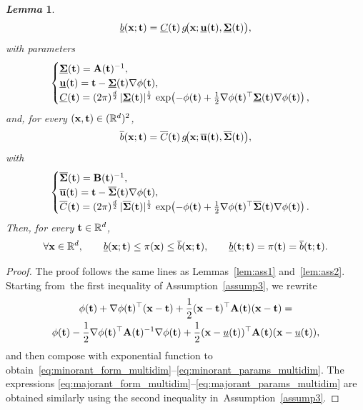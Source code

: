 \documentclass[review]{elsarticle}
\newtheorem{lemma}{\em Lemma}
\def\x{{\bf x}}
\def\u{{\bf u}}
\def\t{{\bf t}}
\def\A{{\bf A}}
\def\B{{\bf B}}
\begin{document}
{\begin{lemma}
\begin{equation}
\underline{b}(\x;\t)=\underline{C}(\t)\, g\!\big(\x;\underline{\u}(\t),\underline{\boldsymbol{\Sigma}}(\t)\big),
\end{equation}
with parameters
\begin{equation}
\label{eq:minorant_params_multidim}
\begin{cases}
\underline{\boldsymbol{\Sigma}}(\t)=\A(\t)^{-1},
\\
\underline{\u}(\t)=\t-\underline{\boldsymbol{\Sigma}}(\t)\nabla \phi(\t),
\\
\underline{C}(\t)=(2\pi)^{\frac d2}\,|\underline{\boldsymbol{\Sigma}}(\t)|^{\frac12}\,
\exp\!\left(-\phi(\t)+\frac12 \nabla\phi(\t)^\top \underline{\boldsymbol{\Sigma}}(\t)\nabla\phi(\t)\right),
\end{cases}
\end{equation}
and, for every $(\x,\t)\in(\mathbb{R}^d)^2$,
\begin{equation}
\label{eq:majorant_form_multidim}
\overline{b}(\x;\t)=\overline{C}(\t)\, g\!\big(\x;\overline{\u}(\t),\overline{\boldsymbol{\Sigma}}(\t)\big),
\end{equation}
with
\begin{equation}
\label{eq:majorant_params_multidim}
\begin{cases}
\overline{\boldsymbol{\Sigma}}(\t)=\B(\t)^{-1},
\\
\overline{\u}(\t)=\t-\overline{\boldsymbol{\Sigma}}(\t)\nabla \phi(\t),
\\
\overline{C}(\t)=(2\pi)^{\frac d2}\,|\overline{\boldsymbol{\Sigma}}(\t)|^{\frac12}\,
\exp\!\left(-\phi(\t)+\frac12 \nabla\phi(\t)^\top \overline{\boldsymbol{\Sigma}}(\t)\nabla\phi(\t)\right).
\end{cases}
\end{equation}
Then, for every $\t\in\mathbb{R}^d$, 
\begin{equation}
\label{eq:tgt_min_maj_multidim}
\forall \x\in\mathbb{R}^d,\qquad
\underline{b}(\x;\t)\le \pi(\x)\le \overline{b}(\x;\t),
\qquad
\underline{b}(\t;\t)=\pi(\t)=\overline{b}(\t;\t).
\end{equation}
\end{lemma}
%
\begin{proof}
The proof follows the same lines as Lemmas~\ref{lem:ass1} and~\ref{lem:ass2}. Starting from~the first inequality of Assumption~\ref{assump3}, we rewrite
\begin{multline}
\phi(\t)+\nabla \phi(\t)^\top (\x-\t)+\frac12 (\x-\t)^\top \A(\t)(\x-\t)
= \\
\phi(\t)-\frac12 \nabla\phi(\t)^\top \A(\t)^{-1}\nabla\phi(\t)
+\frac12 (\x-\underline{u}(\t))^\top \A(\t)(\x-\underline{u}(\t)),
\end{multline}
and then compose with exponential function to obtain~\eqref{eq:minorant_form_multidim}--\eqref{eq:minorant_params_multidim}. The expressions
\eqref{eq:majorant_form_multidim}--\eqref{eq:majorant_params_multidim} are obtained similarly using the second inequality in~Assumption~\ref{assump3}.
\end{proof}
%
}
\end{document}

